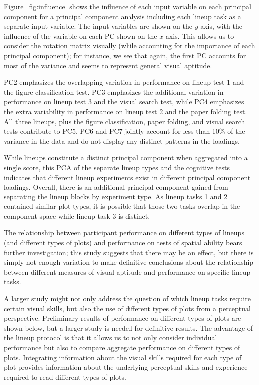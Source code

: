 \documentclass[11pt]{isuthesis}\usepackage[]{graphicx}\usepackage[]{color}
\begin{document}
Figure~\ref{fig:influence} shows the influence of each input variable on each principal component for a principal component analysis  including each lineup task as a separate input variable. The input variables are shown on the $y$ axis, with the influence of the variable on each PC shown on the $x$ axis. This allows us to consider the rotation matrix visually (while accounting for the importance of each principal component); for instance, we see that again, the first PC accounts for most of the variance and seems to represent general visual aptitude. 

PC2 emphasizes the overlapping variation in performance on lineup test 1 and the figure classification test. PC3 emphasizes the additional variation in performance on lineup test 3 and the visual search test, while PC4 emphasizes the extra variability in performance on lineup test 2 and the paper folding test. All three lineups, plus the figure classification, paper folding, and visual search tests contribute to PC5. PC6 and PC7 jointly account for less than 10\% of the variance in the data and do not display any distinct patterns in the loadings. 

While lineups constitute a distinct principal component when aggregated into a single score, this PCA of the separate lineup types and the cognitive tests indicates that different lineup experiments exist in different principal component loadings. Overall, there is an additional principal component gained from separating the lineup blocks by experiment type. As lineup tasks 1 and 2 contained similar plot types, it is possible that those two tasks overlap in the component space while lineup task 3 is distinct. 




The relationship between participant performance on different types of lineups (and different types of plots) and performance on tests of spatial ability bears further investigation; this study suggests that there may be an effect, but there is simply not enough variation to make definitive conclusions about the relationship between different measures of visual aptitude and performance on specific lineup tasks. 

A larger study might not only address the question of which lineup tasks require certain visual skills, but also the use of different types of plots from a perceptual perspective. Preliminary results of performance on different types of plots are shown below, but a larger study is needed for definitive results. The advantage of the lineup protocol is that it allows us to not only consider individual performance but also to compare aggregate performance on different types of plots. Integrating information about the visual skills required for each type of plot provides information about the underlying perceptual skills and experience required to read different types of plots.
\end{document}
